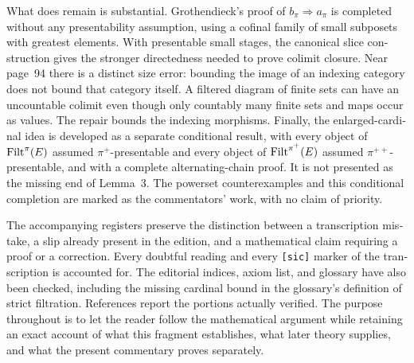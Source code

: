 \begin{otherlanguage}{english}
What does remain is substantial. Grothendieck's proof of $b_\pi\Rightarrow a_\pi$ is completed without any presentability assumption, using a cofinal family of small subposets with greatest elements. With presentable small stages, the canonical slice construction gives the stronger directedness needed to prove colimit closure. Near page~94 there is a distinct size error: bounding the image of an indexing category does not bound that category itself. A filtered diagram of finite sets can have an uncountable colimit even though only countably many finite sets and maps occur as values. The repair bounds the indexing morphisms. Finally, the enlarged-cardinal idea is developed as a separate conditional result, with every object of $\mathrm{Filt}^\pi(E)$ assumed $\pi^+$-presentable and every object of $\mathrm{Filt}^{\pi^+}(E)$ assumed $\pi^{++}$-presentable, and with a complete alternating-chain proof. It is not presented as the missing end of Lemma~3. The powerset counterexamples and this conditional completion are marked as the commentators' work, with no claim of priority.

The accompanying registers preserve the distinction between a transcription mistake, a slip already present in the edition, and a mathematical claim requiring a proof or a correction. Every doubtful reading and every \texttt{[sic]} marker of the transcription is accounted for. The editorial indices, axiom list, and glossary have also been checked, including the missing cardinal bound in the glossary's definition of strict filtration. References report the portions actually verified. The purpose throughout is to let the reader follow the mathematical argument while retaining an exact account of what this fragment establishes, what later theory supplies, and what the present commentary proves separately.
\end{otherlanguage}
\dgrchunkend
